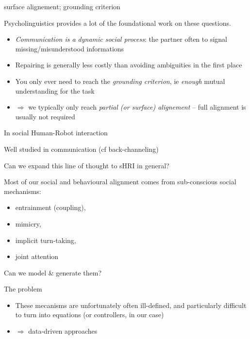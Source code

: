 \documentclass[compress]{beamer}
\begin{document}
{
\begin{frame}{surface alignement; grounding criterion}

    Psycholinguistics provides a lot of the foundational work on these
    questions.

    \begin{itemize}
        \item<+-> \emph{Communication is a dynamic social process}: the partner often to signal
            missing/misunderstood informations
        \item<+-> Repairing is generally less costly than avoiding ambiguities in
            the first place
        \item<+-> You only ever need to reach the \emph{grounding criterion}, ie
            \emph{enough} mutual understanding for the task
        \item<+-> $\Rightarrow$ we typically only reach \emph{partial (or surface)
            alignement} -- full alignment is usually not required
    \end{itemize}
\end{frame}
}

\begin{frame}{In social Human-Robot interaction}
    
    Well studied in communication (cf back-channeling)

    Can we expand this line of thought to sHRI in general?

    Most of our social and behavioural alignment comes from sub-conscious social
    mechanisms:

    \begin{itemize}
        \item entrainment (coupling), 
        \item mimicry, 
        \item implicit turn-taking,
        \item joint attention
    \end{itemize}
    \pause
    Can we model \& generate them?
\end{frame}

\begin{frame}{The problem}
    \begin{itemize}
        \item These mecanisms are unfortunately often ill-defined, and
            particularly difficult to turn into equations (or controllers, in
            our case)
        \item $\Rightarrow$ data-driven approaches
    \end{itemize}
\end{frame}
\end{document}
